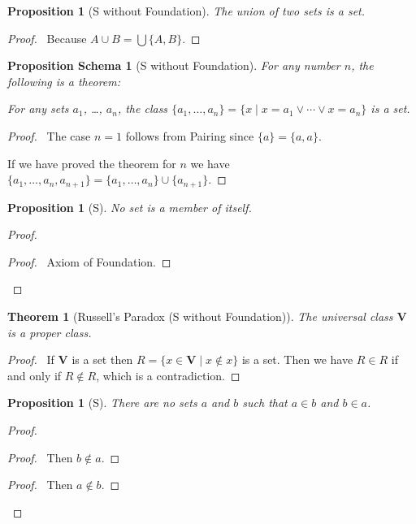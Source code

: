 \documentclass{book}
\let\qed\relax
\newtheorem{prop}[ax]{Proposition}
\newtheorem{props}[ax]{Proposition Schema}
\newtheorem{thm}[ax]{Theorem}
\theoremstyle{definition}
\begin{document}
\begin{prop}[S without Foundation]
The union of two sets is a set.
\end{prop}

\begin{proof}
\pf\ Because $A \cup B = \bigcup \{A,B\}$. \qed
\end{proof}

\begin{props}[S without Foundation]
For any number $n$, the following is a theorem:

For any sets $a_1$, \ldots, $a_n$, the class $\{a_1, \ldots, a_n\} = \{x \mid x = a_1 \vee \cdots \vee x = a_n\}$ is a set.
\end{props}

\begin{proof}
\pf\ The case $n=1$ follows from Pairing since $\{a\} = \{a,a\}$.

If we have proved the theorem for $n$ we have $\{a_1, \ldots, a_n, a_{n+1}\} = \{a_1, \ldots, a_n\} \cup \{a_{n+1}\}$. \qed
\end{proof}

\begin{prop}[S]
\label{prop:xnotinx}
No set is a member of itself.
\end{prop}

\begin{proof}
\pf
{}
\begin{proof}
	\pf\ Axiom of Foundation.
\end{proof}
\qed
\end{proof}

\begin{thm}[Russell's Paradox (S without Foundation)]
The universal class $\mathbf{V}$ is a proper class.
\end{thm}

\begin{proof}
\pf\ If $\mathbf{V}$ is a set then $R = \{ x \in \mathbf{V} \mid x \notin x \}$ is a set. Then we have $R \in R$ if and only if $R \notin R$, which is a contradiction. \qed
\end{proof}

\begin{prop}[S]
There are no sets $a$ and $b$ such that $a \in b$ and $b \in a$.
\end{prop}

\begin{proof}
\pf
{}
\begin{proof}
	\pf\ Then $b \notin a$.
\end{proof}
\begin{proof}
	\pf\ Then $a \notin b$.
\end{proof}
\qed
\end{proof}
\end{document}
